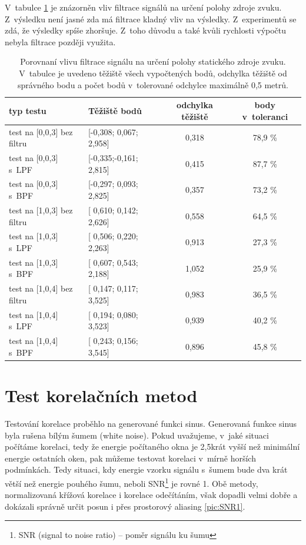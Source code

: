 \newpage
V~tabulce \ref{tabulka5} je znázorněn vliv filtrace signálů na určení polohy zdroje zvuku. Z~výsledku není jasné zda má filtrace kladný vliv na výsledky. Z~experimentů se zdá, že výsledky spíše zhoršuje. Z~toho důvodu a také kvůli rychlosti výpočtu nebyla filtrace později využita.

\begin{table}[!h]
    \centering
    \begin{tabular}{|| l | l | c | c||} 
 \hline
 typ testu & Těžiště bodů & odchylka těžiště & body v~toleranci \\ [0.5ex]
 \hline
 test na [0,0,3] bez filtru & [-0,308; 0,067; 2,958] & 0,318 & 78,9 \% \\ 
 \hline
 test na [0,0,3] s~LPF & [-0,335;-0,161; 2,815] & 0,415 & 87,7 \% \\
 \hline
 test na [0,0,3] s~BPF & [-0,297; 0,093; 2,825] & 0,357 & 73,2 \% \\
 \hline
 test na [1,0,3] bez filtru & [ 0,610; 0,142; 2,626] & 0,558 & 64,5 \% \\
 \hline
 test na [1,0,3] s~LPF & [ 0,506; 0,220; 2,263] & 0,913 & 27,3 \% \\
 \hline
 test na [1,0,3] s~BPF & [ 0,607; 0,543; 2,188] & 1,052 & 25,9 \% \\
 \hline
 test na [1,0,4] bez filtru & [ 0,147; 0,117; 3,525] & 0,983 & 36,5 \% \\ 
 \hline
 test na [1,0,4] s~LPF & [ 0,194; 0,080; 3,523] & 0,939 & 40,2 \% \\
 \hline
 test na [1,0,4] s~BPF & [ 0,243; 0,156; 3,545] & 0,896 & 45,8 \% \\ 
 \hline
    \end{tabular}
    \caption{Porovnaní vlivu filtrace signálu na určení polohy statického zdroje zvuku. V~tabulce je uvedeno těžiště všech vypočtených bodů, odchylka těžiště od správného bodu a počet bodů v~tolerované odchylce maximálně 0,5 metrů.}
    \label{tabulka5}
\end{table}

\section{Test korelačních metod}

Testování korelace proběhlo na generované funkci sinus. Generovaná funkce sinus byla rušena bílým šumem (white noise). Pokud uvažujeme, v~jaké situaci počítáme korelaci, tedy že energie počítaného okna je 2,5krát vyšší než minimální energie ostatních oken, pak můžeme testovat korelaci v~mírně horších podmínkách. Tedy situaci, kdy energie vzorku signálu s~šumem bude dva krát větší než energie pouhého šumu, neboli SNR\footnote{SNR (signal to noise ratio) – poměr signálu ku šumu} je rovné 1. Obě metody, normalizovaná křížová korelace i korelace odečítáním, však dopadli velmi dobře a dokázali správně určit posun i přes prostorový aliasing \ref{pic:SNR1}. 

